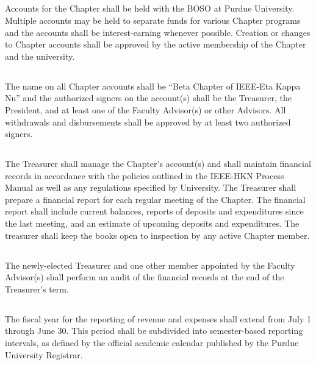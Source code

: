 \documentclass[10pt, oneside]{article}
\begin{document}
\subsection{}
Accounts for the Chapter shall be held with the BOSO at Purdue University.
Multiple accounts may be held to separate funds for various Chapter programs and the accounts shall be interest-earning whenever possible. Creation or changes to Chapter accounts shall be approved by the active membership of the Chapter and the university.

\subsection{}
The name on all Chapter accounts shall be “Beta Chapter of IEEE-Eta Kappa Nu” and the authorized signers on the account(s) shall be the Treasurer, the President, and at least one of the Faculty Advisor(s) or other Advisors. All withdrawals and disbursements shall be approved by at least two authorized signers.
\subsection{}
The Treasurer shall manage the Chapter’s account(s) and shall maintain financial records in accordance with the policies outlined in the IEEE-HKN Process Manual as well as any regulations specified by University. The Treasurer shall prepare a financial report for each regular meeting of the Chapter. The financial report shall include current balances, reports of deposits and expenditures since the last meeting, and an estimate of upcoming deposits and expenditures. The treasurer shall keep the books open to inspection by any active Chapter member.

\subsection{}
The newly-elected Treasurer and one other member appointed by the Faculty Advisor(s) shall perform an audit of the financial records at the end of the Treasurer’s term.

\subsection{}
The fiscal year for the reporting of revenue and expenses shall extend from July 1 through June 30. This period shall be subdivided into semester-based reporting intervals, as defined by the official academic calendar published by the Purdue University Registrar.
\end{document}
